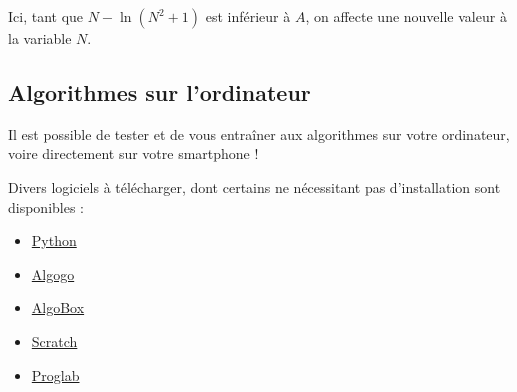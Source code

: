 	\begin{tip}
		Ici, tant que $N - \ln(N^2 + 1)$ est inférieur à $A$, on affecte une nouvelle valeur à la variable $N$.
	\end{tip}
	
	\begin{nosummary}
		\section{Algorithmes sur l'ordinateur}
		
		Il est possible de tester et de vous entraîner aux algorithmes sur votre ordinateur, voire directement sur votre smartphone !
		
		\begin{tip}
			Divers logiciels à télécharger, dont certains ne nécessitant pas d'installation sont disponibles :
			\begin{itemize}
				\item \href{https://python.org}{Python}
				\item \href{https://www.algogo.xyz}{Algogo}
				\item \href{http://www.xm1math.net/algobox/}{AlgoBox}
				\item \href{https://scratch.mit.edu/}{Scratch}
				\item \href{http://proglab.fr/}{Proglab}
			\end{itemize}
		\end{tip}
	\end{nosummary}
